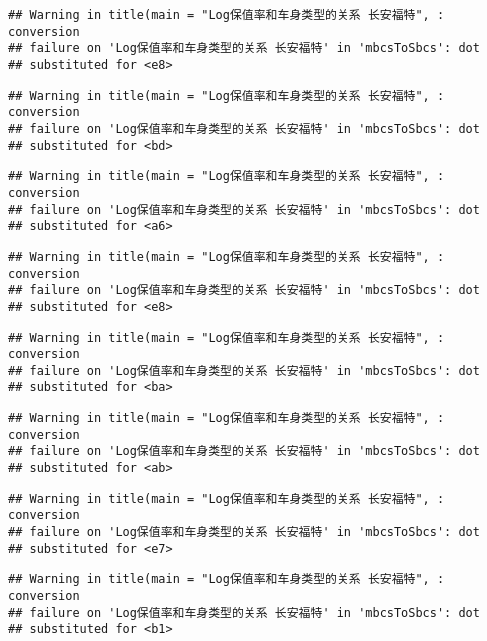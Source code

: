 \documentclass[]{article}
\begin{document}
\begin{verbatim}
## Warning in title(main = "Log保值率和车身类型的关系 长安福特", : conversion
## failure on 'Log保值率和车身类型的关系 长安福特' in 'mbcsToSbcs': dot
## substituted for <e8>
\end{verbatim}

\begin{verbatim}
## Warning in title(main = "Log保值率和车身类型的关系 长安福特", : conversion
## failure on 'Log保值率和车身类型的关系 长安福特' in 'mbcsToSbcs': dot
## substituted for <bd>
\end{verbatim}

\begin{verbatim}
## Warning in title(main = "Log保值率和车身类型的关系 长安福特", : conversion
## failure on 'Log保值率和车身类型的关系 长安福特' in 'mbcsToSbcs': dot
## substituted for <a6>
\end{verbatim}

\begin{verbatim}
## Warning in title(main = "Log保值率和车身类型的关系 长安福特", : conversion
## failure on 'Log保值率和车身类型的关系 长安福特' in 'mbcsToSbcs': dot
## substituted for <e8>
\end{verbatim}

\begin{verbatim}
## Warning in title(main = "Log保值率和车身类型的关系 长安福特", : conversion
## failure on 'Log保值率和车身类型的关系 长安福特' in 'mbcsToSbcs': dot
## substituted for <ba>
\end{verbatim}

\begin{verbatim}
## Warning in title(main = "Log保值率和车身类型的关系 长安福特", : conversion
## failure on 'Log保值率和车身类型的关系 长安福特' in 'mbcsToSbcs': dot
## substituted for <ab>
\end{verbatim}

\begin{verbatim}
## Warning in title(main = "Log保值率和车身类型的关系 长安福特", : conversion
## failure on 'Log保值率和车身类型的关系 长安福特' in 'mbcsToSbcs': dot
## substituted for <e7>
\end{verbatim}

\begin{verbatim}
## Warning in title(main = "Log保值率和车身类型的关系 长安福特", : conversion
## failure on 'Log保值率和车身类型的关系 长安福特' in 'mbcsToSbcs': dot
## substituted for <b1>
\end{verbatim}
\end{document}
